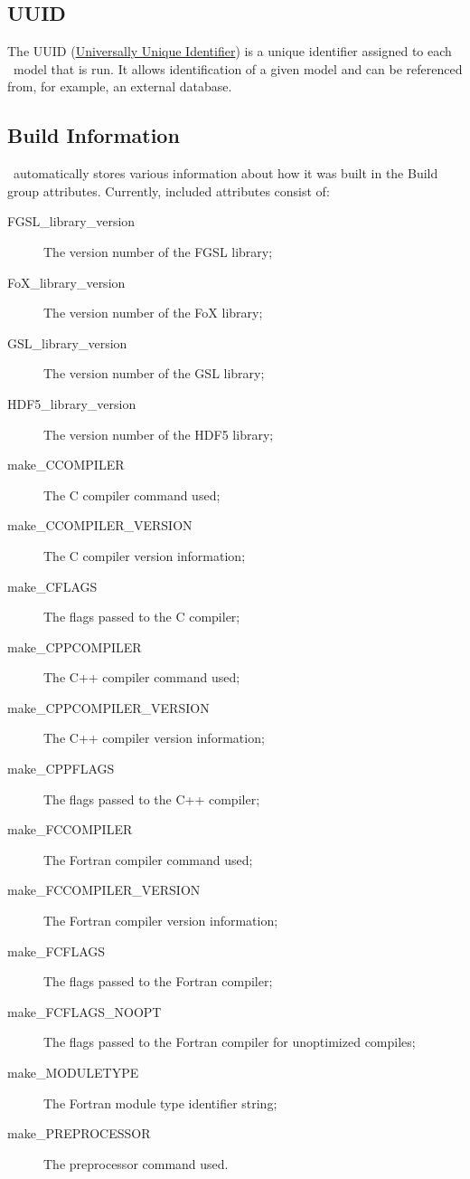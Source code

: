 \subsection{UUID}\label{sec:UUID}

The UUID (\href{https://secure.wikimedia.org/wikipedia/en/wiki/Universally_unique_identifier}{Universally Unique Identifier}) is a unique identifier assigned to each \glc\ model that is run. It allows identification of a given model and can be referenced from, for example, an external database.

\subsection{Build Information}\label{sec:BuildInformation}

\glc\ automatically stores various information about how it was built in the {\normalfont \ttfamily Build} group attributes. Currently, included attributes consist of:
\begin{description}
\item[{\normalfont \ttfamily FGSL\_library\_version}] The version number of the FGSL library;
\item[{\normalfont \ttfamily FoX\_library\_version}] The version number of the FoX library;
\item[{\normalfont \ttfamily GSL\_library\_version}] The version number of the GSL library;
\item[{\normalfont \ttfamily HDF5\_library\_version}] The version number of the HDF5 library;
\item[{\normalfont \ttfamily make\_CCOMPILER}] The C compiler command used;
\item[{\normalfont \ttfamily make\_CCOMPILER\_VERSION}] The C compiler version information;
\item[{\normalfont \ttfamily make\_CFLAGS}] The flags passed to the C compiler;
\item[{\normalfont \ttfamily make\_CPPCOMPILER}] The C++ compiler command used;
\item[{\normalfont \ttfamily make\_CPPCOMPILER\_VERSION}] The C++ compiler version information;
\item[{\normalfont \ttfamily make\_CPPFLAGS}] The flags passed to the C++ compiler;
\item[{\normalfont \ttfamily make\_FCCOMPILER}] The Fortran compiler command used;
\item[{\normalfont \ttfamily make\_FCCOMPILER\_VERSION}] The Fortran compiler version information;
\item[{\normalfont \ttfamily make\_FCFLAGS}] The flags passed to the Fortran compiler;
\item[{\normalfont \ttfamily make\_FCFLAGS\_NOOPT}] The flags passed to the Fortran compiler for unoptimized compiles;
\item[{\normalfont \ttfamily make\_MODULETYPE}] The Fortran module type identifier string;
\item[{\normalfont \ttfamily make\_PREPROCESSOR}] The preprocessor command used.
\end{description}

